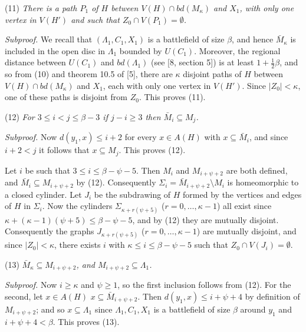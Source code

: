 \hspace*{12pt}(11) \textit{There is a path $P_1$ of $H$ between $V(H) \cap bd(M_\kappa)$ and $X_1$, with only one vertex in $V(H')$ and such that $Z_0 \cap V(P_1) = \emptyset$.}

\textit{Subproof.} We recall that $(\Lambda_1, C_1, X_1)$ is a battlefield of size $\beta$, and hence $\bar{M}_\kappa$ is included in the open disc in $\Lambda_1$ bounded by $U(C_1)$. Moreover, the regional distance between $U(C_1)$ and $bd(\Lambda_1)$ (see [8, section 5]) is at least $1 + \frac{1}{2}\beta$, and so from (10) and theorem 10.5 of [5], there are $\kappa$ disjoint paths of $H$ between $V(H) \cap bd(M_\kappa)$ and $X_1$, each with only one vertex in $V(H')$. Since $|Z_0| < \kappa$, one of these paths is disjoint from $Z_0$. This proves (11).

\hspace*{12pt}(12) \textit{For $3 \le i < j \le \beta - 3$ if $j - i \ge 3$ then $\bar{M}_i \subseteq M_j$.}

\textit{Subproof.} Now $d(y_1, x) \le i + 2$ for every $x \in A(H)$ with $x \subseteq \bar{M}_i$, and since $i + 2 < j$ it follows that $x \subseteq M_j$. This proves (12).

Let $i$ be such that $3 \le i \le \beta - \psi - 5$. Then $M_i$ and $M_{i+\psi+2}$ are both defined, and $\bar{M}_i \subseteq M_{i+\psi+2}$ by (12). Consequently $\Sigma_i = \bar{M}_{i+\psi+2} \setminus M_i$ is homeomorphic to a closed cylinder. Let $J_i$ be the subdrawing of $H$ formed by the vertices and edges of $H$ in $\Sigma_i$. Now the cylinders $\Sigma_{\kappa+r(\psi+5)}$ ($r = 0, \ldots, \kappa - 1$) all exist since $\kappa + (\kappa - 1)(\psi + 5) \le \beta - \psi - 5$, and by (12) they are mutually disjoint. Consequently the graphs $J_{\kappa+r(\psi+5)}$ ($r = 0, \ldots, \kappa - 1$) are mutually disjoint, and since $|Z_0| < \kappa$, there exists $i$ with $\kappa \le i \le \beta - \psi - 5$ such that $Z_0 \cap V(J_i) = \emptyset$.

\hspace*{12pt}(13) \textit{$\bar{M}_\kappa \subseteq M_{i+\psi+2}$, and $M_{i+\psi+2} \subseteq \Lambda_1$.}

\textit{Subproof.} Now $i \ge \kappa$ and $\psi \ge 1$, so the first inclusion follows from (12). For the second, let $x \in A(H)$   $x \subseteq \bar{M}_{i+\psi+2}$. Then $d(y_1, x) \le i + \psi + 4$ by definition of $M_{i+\psi+2}$; and so $x \subseteq \Lambda_1$ since $\Lambda_1, C_1, X_1$ is a battlefield of size $\beta$ around $y_1$ and $i + \psi + 4 < \beta$. This proves (13).


